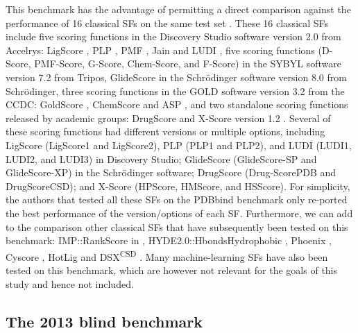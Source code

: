 This benchmark has the advantage of permitting a direct comparison against the performance of 16 classical SFs on the same test set \citep{1313}. These 16 classical SFs include five scoring functions in the Discovery Studio software version 2.0 from Accelrys: LigScore \citep{1466}, PLP \citep{1467}, PMF \citep{1468}, Jain \citep{1473} and LUDI \citep{1463}, five scoring functions (D-Score, PMF-Score, G-Score, Chem-Score, and F-Score) in the SYBYL software version 7.2 from Tripos, GlideScore \citep{1465} in the Schrödinger software version 8.0 from Schrödinger, three scoring functions in the GOLD software version 3.2 from the CCDC: GoldScore \citep{1474}, ChemScore \citep{1464} and ASP \citep{1469}, and two standalone scoring functions released by academic groups: DrugScore \citep{1470,1475} and X-Score version 1.2 \citep{573}. Several of these scoring functions had different versions or multiple options, including LigScore (LigScore1 and LigScore2), PLP (PLP1 and PLP2), and LUDI (LUDI1, LUDI2, and LUDI3) in Discovery Studio; GlideScore (GlideScore-SP and GlideScore-XP) in the Schrödinger software; DrugScore (Drug-ScorePDB and DrugScoreCSD); and X-Score (HPScore, HMScore, and HSScore). For simplicity, the authors that tested all these SFs on the PDBbind benchmark \citep{1313} only re-ported the best performance of the version/options of each SF. Furthermore, we can add to the comparison other classical SFs that have subsequently been tested on this benchmark: IMP::RankScore \citep{987} in \citep{1370}, HYDE2.0::HbondsHydrophobic \citep{1458}, Phoenix \citep{576}, Cyscore \citep{1372}, HotLig \citep{1459} and DSX\textsuperscript{CSD} \citep{1460}. Many machine-learning SFs have also been tested on this benchmark, which are however not relevant for the goals of this study and hence not included.

\subsection{The 2013 blind benchmark}

